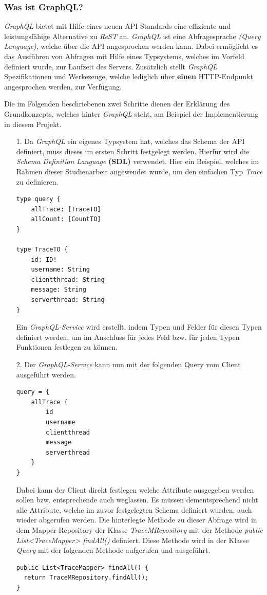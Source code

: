 \documentclass[10pt,journal,compsoc]{IEEEtran}
\begin{document}
\subsubsection{Was ist GraphQL?}
\textit{GraphQL} bietet mit Hilfe eines neuen API Standards eine effiziente und leistungsfähige Alternative zu \textit{ReST} an. \textit{GraphQL} ist eine Abfragesprache \textit{(Query Language)}, welche über die API angesprochen werden kann. Dabei ermöglicht es das Ausführen von Abfragen mit Hilfe eines Typsystems, welches im Vorfeld definiert wurde, zur Laufzeit des Servers. Zusätzlich stellt \textit{GraphQL} Spezifikationen und Werkezeuge, welche lediglich über \textbf{einen} HTTP-Endpunkt angesprochen werden, zur Verfügung. \cite{GraphQL:Introduction}

Die im Folgenden beschriebenen zwei Schritte dienen der Erklärung des Grundkonzepts, welches hinter \textit{GraphQL} steht, am Beispiel der Implementierung in diesem Projekt.
\begin{itemize}
	\item[1.]
	Da \textit{GraphQL} ein eigenes Typsystem hat, welches das Schema der API definiert, muss dieses im ersten Schritt festgelegt werden. Hierfür wird die \textit{Schema Definition Language} \textbf{(SDL)} verwendet. Hier ein Beispiel, welches im Rahmen dieser Studienarbeit angewendet wurde, um den einfachen Typ \textit{Trace} zu definieren. 
	
\begin{lstlisting}
type query {
	allTrace: [TraceTO]
	allCount: [CountTO]
}

type TraceTO {	
	id: ID!
	username: String
	clientthread: String
	message: String
	serverthread: String
}
\end{lstlisting}
	Ein \textit{GraphQL-Service} wird erstellt, indem Typen und Felder für diesen Typen definiert werden, um im Anschluss für jedes Feld bzw. für jeden Typen Funktionen festlegen zu können.
	\item[2.]
	Der \textit{GraphQL-Service} kann nun mit der folgenden Query vom Client ausgeführt werden. \cite{GraphQL:howtoGraphQL}
\begin{lstlisting}
query = {
	allTrace {
		id
		username
		clientthread
		message
		serverthread
	}
}
\end{lstlisting}
	Dabei kann der Client direkt festlegen welche Attribute ausgegeben werden sollen bzw. entsprechende auch weglassen. Es müssen dementsprechend nicht alle Attribute, welche im zuvor festgelegten Schema definiert wurden, auch wieder abgerufen werden. Die hinterlegte Methode zu dieser Abfrage wird in dem Mapper-Repository der Klasse \textit{TraceMRepository} mit der Methode \textit{public List<TraceMapper> findAll()} definiert.  Diese Methode wird in der Klasse \textit{Query} mit der folgenden Methode aufgerufen und ausgeführt. \cite{GraphQL:howtoGraphQL}
\begin{lstlisting}
public List<TraceMapper> findAll() {
  return TraceMRepository.findAll();
}
\end{lstlisting}
	\end{itemize}
\end{document}
